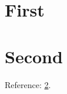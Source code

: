 \documentclass{article}
\begin{document}
\section{First}\label{dup}
\section{Second}\label{dup}
Reference: \ref{dup}.
\end{document}
